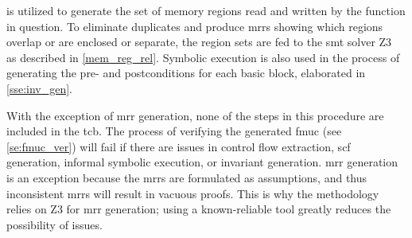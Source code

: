 is utilized to generate the set of memory regions%
read and written by the function in question.
To eliminate duplicates and produce \acp{mrr}
showing which regions overlap or are enclosed or separate,%
%
the region sets are fed to the \ac{smt} solver Z3~\citep{de2008z3}
as described in \cref{mem_reg_rel}.
Symbolic execution is also used in the process of generating
the pre- and postconditions for each basic block,
elaborated in \cref{sse:inv_gen}.

With the exception of \ac{mrr} generation,
none of the steps in this procedure are included in the \ac{tcb}.
The process of verifying the generated \ac{fmuc} (see \cref{se:fmuc_ver})
will fail if there are issues in control flow extraction,
\ac{scf} generation, informal symbolic execution, or invariant generation.
\Ac{mrr} generation is an exception
because the \acp{mrr} are formulated as assumptions,
and thus inconsistent \acp{mrr} will result in vacuous proofs.
This is why the methodology relies on Z3 for \ac{mrr} generation;
using a known-reliable tool greatly reduces the possibility of issues.

